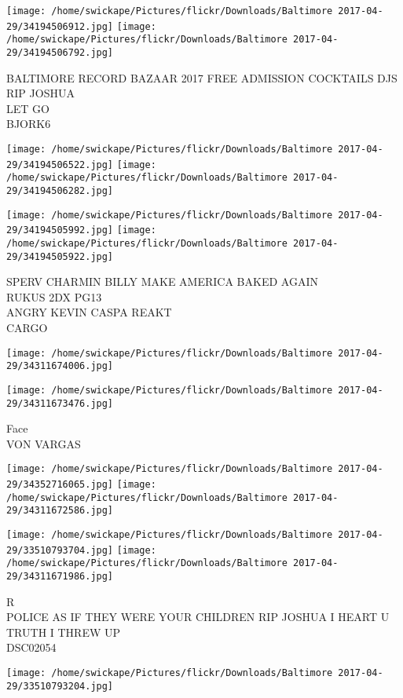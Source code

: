 \documentclass[10pt,letterpaper]{article}
\begin{document}
\texttt{[image: /home/swickape/Pictures/flickr/Downloads/Baltimore 2017-04-29/34194506912.jpg]}
\texttt{[image: /home/swickape/Pictures/flickr/Downloads/Baltimore 2017-04-29/34194506792.jpg]}

BALTIMORE RECORD BAZAAR 2017 FREE ADMISSION COCKTAILS DJS\\
RIP JOSHUA\\
LET GO\\
BJORK6
\pagebreak

\texttt{[image: /home/swickape/Pictures/flickr/Downloads/Baltimore 2017-04-29/34194506522.jpg]}
\texttt{[image: /home/swickape/Pictures/flickr/Downloads/Baltimore 2017-04-29/34194506282.jpg]}

\texttt{[image: /home/swickape/Pictures/flickr/Downloads/Baltimore 2017-04-29/34194505992.jpg]}
\texttt{[image: /home/swickape/Pictures/flickr/Downloads/Baltimore 2017-04-29/34194505922.jpg]}

SPERV CHARMIN BILLY MAKE AMERICA BAKED AGAIN\\
RUKUS 2DX PG13\\
ANGRY KEVIN CASPA REAKT\\
CARGO
\pagebreak

\texttt{[image: /home/swickape/Pictures/flickr/Downloads/Baltimore 2017-04-29/34311674006.jpg]}

\vspace{0.25in}
\texttt{[image: /home/swickape/Pictures/flickr/Downloads/Baltimore 2017-04-29/34311673476.jpg]}

Face\\
VON VARGAS
\pagebreak

\texttt{[image: /home/swickape/Pictures/flickr/Downloads/Baltimore 2017-04-29/34352716065.jpg]}
\texttt{[image: /home/swickape/Pictures/flickr/Downloads/Baltimore 2017-04-29/34311672586.jpg]}

\texttt{[image: /home/swickape/Pictures/flickr/Downloads/Baltimore 2017-04-29/33510793704.jpg]}
\texttt{[image: /home/swickape/Pictures/flickr/Downloads/Baltimore 2017-04-29/34311671986.jpg]}

R\\
POLICE AS IF THEY WERE YOUR CHILDREN RIP JOSHUA I HEART U\\
TRUTH I THREW UP\\
DSC02054
\pagebreak

\texttt{[image: /home/swickape/Pictures/flickr/Downloads/Baltimore 2017-04-29/33510793204.jpg]}
\end{document}
